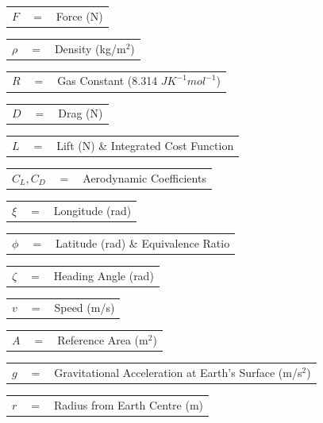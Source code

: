 \begin{tabular}{p{1.2cm}p{1cm}p{5cm}}
	$F$ & $=$ & Force (N)\\
\end{tabular} 
\begin{tabular}{p{1.2cm}p{1cm}p{5cm}}
	$\rho$ & $=$ & Density (kg/m$^2$)\\
\end{tabular} 
\begin{tabular}{p{1.2cm}p{1cm}p{5cm}}
	$R$ & $=$ & Gas Constant (8.314 $J K^{-1} mol^{-1}$)\\
\end{tabular} 
\begin{tabular}{p{1.2cm}p{1cm}p{5cm}}
	$D$ & $=$ & Drag (N)\\
\end{tabular} 
\begin{tabular}{p{1.2cm}p{1cm}p{5cm}}
	$L$ & $=$ & Lift (N) \& Integrated Cost Function\\
\end{tabular} 
\begin{tabular}{p{1.2cm}p{1cm}p{5cm}}
	$C_L,C_D$ & $=$ & Aerodynamic Coefficients\\
\end{tabular} 
\begin{tabular}{p{1.2cm}p{1cm}p{5cm}}
	$\xi$ & $=$ & Longitude (rad)\\
\end{tabular} 
\begin{tabular}{p{1.2cm}p{1cm}p{5cm}}
	$\phi$ & $=$ & Latitude (rad) \& Equivalence Ratio\\
\end{tabular} 
\begin{tabular}{p{1.2cm}p{1cm}p{5cm}}
	$\zeta$ & $=$ & Heading Angle (rad)\\
\end{tabular} 
\begin{tabular}{p{1.2cm}p{1cm}p{5cm}}
	$v$ & $=$ & Speed (m/s)\\
\end{tabular} 
\begin{tabular}{p{1.2cm}p{1cm}p{5cm}}
	$A$ & $=$ & Reference Area (m$^2$)\\
\end{tabular} 
\begin{tabular}{p{1.2cm}p{1cm}p{5cm}}
	$g$ & $=$ & Gravitational Acceleration at Earth's Surface (m/s$^2$)\\
\end{tabular} 
\begin{tabular}{p{1.2cm}p{1cm}p{5cm}}
	
	
	$r$ & $=$ & Radius from Earth Centre (m)\\
\end{tabular} 
